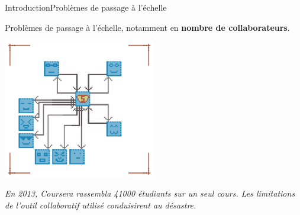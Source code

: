 \begin{frame}{Introduction}{Problèmes de passage à l'échelle}
  

  Problèmes de passage à l'échelle, notamment en \textbf{nombre de
    collaborateurs}.
  
  \vspace{0.5cm}
  
  \begin{center}
    \includegraphics[width=0.5\textwidth]{img/centralizedcpuproblems.png}
  \end{center}
  
  \vspace{0.25cm}

  \textit{En 2013, Coursera rassembla 41000 étudiants sur un seul cours.  Les
    limitations de l'outil collaboratif utilisé conduisirent au \og
    désastre\fg{}.}

  \vspace{0.25cm}




\end{frame}
